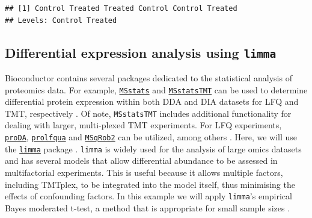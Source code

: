 \documentclass[9pt,a4paper,]{extarticle}
\newenvironment{Shaded}{\begin{snugshade}}{\end{snugshade}}
\newcommand{\AttributeTok}[1]{\textcolor[rgb]{0.13,0.29,0.53}{#1}}
\newcommand{\FunctionTok}[1]{\textcolor[rgb]{0.13,0.29,0.53}{\textbf{#1}}}
\newcommand{\NormalTok}[1]{#1}
\newcommand{\OtherTok}[1]{\textcolor[rgb]{0.56,0.35,0.01}{#1}}
\newcommand{\SpecialCharTok}[1]{\textcolor[rgb]{0.81,0.36,0.00}{\textbf{#1}}}
\newcommand{\StringTok}[1]{\textcolor[rgb]{0.31,0.60,0.02}{#1}}
\begin{document}
\begin{verbatim}
## [1] Control Treated Treated Control Control Treated
## Levels: Control Treated
\end{verbatim}

\begin{Shaded}
\end{Shaded}

\subsection{\texorpdfstring{Differential expression analysis using \texttt{limma}}{Differential expression analysis using limma}}\label{differential-expression-analysis-using-limma}

Bioconductor contains several packages dedicated to the statistical analysis of
proteomics data. For example, \href{https://bioconductor.org/packages/3.15/bioc/html/MSstats.html}{\texttt{MSstats}}
and \href{https://bioconductor.org/packages/3.15/bioc/html/MSstatsTMT.html}{\texttt{MSstatsTMT}}
can be used to determine differential protein expression within both DDA and DIA
datasets for LFQ and TMT, respectively \citep{Choi2014, Huang2020}. Of note,
\texttt{MSstatsTMT} includes additional functionality for dealing with larger,
multi-plexed TMT experiments. For LFQ experiments,
\href{https://bioconductor.org/packages/release/bioc/html/proDA.html}{\texttt{proDA}},
\href{https://rdrr.io/github/wolski/prolfqua/}{\texttt{prolfqua}} and
\href{https://www.bioconductor.org/packages/release/bioc/html/msqrob2.html}{\texttt{MSqRob2}}
can be utilized, among others \citep{Goeminne2020, Wolski2023}. Here, we will use the
\href{https://bioconductor.org/packages/release/bioc/html/limma.html}{\texttt{limma}}
package \citep{Ritchie2015}. \texttt{limma} is widely used for the analysis of large omics
datasets and has several models that allow differential abundance to be assessed
in multifactorial experiments. This is useful because it allows multiple factors,
including TMTplex, to be integrated into the model itself, thus minimising the
effects of confounding factors. In this example we will apply \texttt{limma}'s
empirical Bayes moderated t-test, a method that is appropriate for small sample
sizes \citep{Smyth2004}.
\end{document}

